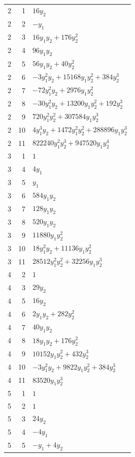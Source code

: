 \documentclass[10pt,a4paper]{article}
\begin{document}
{\begin{longtable}{rrp{125mm}}
2 & 1 & $16 y_{2}$\\
2 & 2 & $- y_{1}$\\
2 & 3 & $16 y_{1} y_{2} + 176 y_{2}^{2}$\\
2 & 4 & $96 y_{1} y_{2}$\\
2 & 5 & $56 y_{1} y_{2} + 40 y_{2}^{2}$\\
2 & 6 & $- 3 y_{1}^{2} y_{2} + 15168 y_{1} y_{2}^{2} + 384 y_{2}^{3}$\\
2 & 7 & $- 72 y_{1}^{2} y_{2} + 2976 y_{1} y_{2}^{2}$\\
2 & 8 & $- 30 y_{1}^{2} y_{2} + 13200 y_{1} y_{2}^{2} + 192 y_{2}^{3}$\\
2 & 9 & $720 y_{1}^{2} y_{2}^{2} + 307584 y_{1} y_{2}^{3}$\\
2 & 10 & $4 y_{1}^{3} y_{2} + 1472 y_{1}^{2} y_{2}^{2} + 288896 y_{1} y_{2}^{3}$\\
2 & 11 & $822240 y_{1}^{2} y_{2}^{3} + 947520 y_{1} y_{2}^{4}$\\
3 & 1 & $1$\\
3 & 4 & $4 y_{1}$\\
3 & 5 & $y_{1}$\\
3 & 6 & $584 y_{1} y_{2}$\\
3 & 7 & $128 y_{1} y_{2}$\\
3 & 8 & $520 y_{1} y_{2}$\\
3 & 9 & $11880 y_{1} y_{2}^{2}$\\
3 & 10 & $18 y_{1}^{2} y_{2} + 11136 y_{1} y_{2}^{2}$\\
3 & 11 & $28512 y_{1}^{2} y_{2}^{2} + 32256 y_{1} y_{2}^{3}$\\
4 & 2 & $1$\\
4 & 3 & $29 y_{2}$\\
4 & 5 & $16 y_{2}$\\
4 & 6 & $2 y_{1} y_{2} + 282 y_{2}^{2}$\\
4 & 7 & $40 y_{1} y_{2}$\\
4 & 8 & $18 y_{1} y_{2} + 176 y_{2}^{2}$\\
4 & 9 & $10152 y_{1} y_{2}^{2} + 432 y_{2}^{3}$\\
4 & 10 & $- 3 y_{1}^{2} y_{2} + 9822 y_{1} y_{2}^{2} + 384 y_{2}^{3}$\\
4 & 11 & $83520 y_{1} y_{2}^{3}$\\
5 & 1 & $1$\\
5 & 2 & $1$\\
5 & 3 & $24 y_{2}$\\
5 & 4 & $- 4 y_{1}$\\
5 & 5 & $- y_{1} + 4 y_{2}$\\

\end{longtable}}
\end{document}
